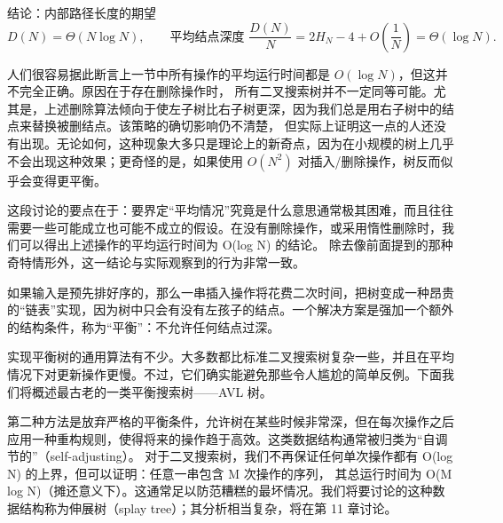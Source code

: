 \documentclass[a4paper]{ctexart}
\theoremstyle{definition}
\theoremstyle{definition}
\begin{document}
结论：内部路径长度的期望
\[
D(N)=\Theta(N\log N),
\qquad
\text{平均结点深度 } \frac{D(N)}{N}=2H_N-4+O\!\left(\frac1N\right)=\Theta(\log N).
\]

人们很容易据此断言上一节中所有操作的平均运行时间都是 $O(\log N)$，但这并不完全正确。原因在于存在删除操作时，
所有二叉搜索树并不一定同等可能。尤其是，上述删除算法倾向于使左子树比右子树更深，因为我们总是用右子树中的结点来替换被删结点。该策略的确切影响仍不清楚，
但实际上证明这一点的人还没有出现。无论如何，这种现象大多只是理论上的新奇点，因为在小规模的树上几乎不会出现这种效果；更奇怪的是，如果使用 $O(N^2)$ 对插入/删除操作，树反而似乎会变得更平衡。

这段讨论的要点在于：要界定“平均情况”究竟是什么意思通常极其困难，而且往往需要一些可能成立也可能不成立的假设。在没有删除操作，或采用惰性删除时，我们可以得出上述操作的平均运行时间为 O(log N) 的结论。
除去像前面提到的那种奇特情形外，这一结论与实际观察到的行为非常一致。

如果输入是预先排好序的，那么一串插入操作将花费二次时间，把树变成一种昂贵的“链表”实现，因为树中只会有没有左孩子的结点。一个解决方案是强加一个额外的结构条件，称为“平衡”：不允许任何结点过深。

实现平衡树的通用算法有不少。大多数都比标准二叉搜索树复杂一些，并且在平均情况下对更新操作更慢。不过，它们确实能避免那些令人尴尬的简单反例。下面我们将概述最古老的一类平衡搜索树——AVL 树。

第二种方法是放弃严格的平衡条件，允许树在某些时候非常深，但在每次操作之后应用一种重构规则，使得将来的操作趋于高效。这类数据结构通常被归类为“自调节的”（self-adjusting）。
对于二叉搜索树，我们不再保证任何单次操作都有 O(log N) 的上界，但可以证明：任意一串包含 M 次操作的序列，
其总运行时间为 O(M log N)（摊还意义下）。这通常足以防范糟糕的最坏情况。我们将要讨论的这种数据结构称为伸展树（splay tree）；其分析相当复杂，将在第 11 章讨论。





\end{document}
